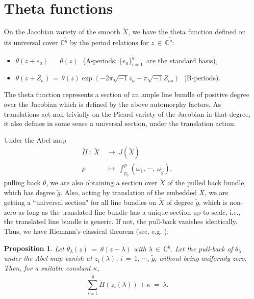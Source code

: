 \documentclass[12pt,reqno]{amsart}
\numberwithin{equation}{section}
\newtheorem{proposition}[theorem]{Proposition}
\theoremstyle{definition}
\theoremstyle{remark}
\def\bC{{\mathbb {C}}}
\begin{document}
\section{Theta functions}

On the Jacobian variety of the smooth $\widetilde X$, we have the theta function defined on its
universal cover $\bC^{\widetilde g}$ by the period relations for $z\,\in\, \bC^{\widetilde g}$:
\begin{itemize} 
\item $\theta(z +e_a) \,=\,\theta(z)$\,\, (A-periods; $\{e_a\}_{i=1}^{\widetilde g}$\, are
the standard basis),

\item $\theta(z+ Z_a)\,=\, \theta(z) \exp(-2\pi\sqrt{-1} z_a -\pi\sqrt{-1} Z_{aa})$\,\, (B-periods).
\end{itemize}

The theta function represents a section of an ample line bundle of positive degree over the
Jacobian which is defined by the above automorphy factors. As translations act non-trivially on the Picard variety of the Jacobian in that degree, it also defines in some sense a universal section, under the translation action.

Under the Abel map 
\begin{align} \nonumber \widetilde \Pi\ :\ \widetilde X\ &\longrightarrow\ J(\widetilde X)\\
p\ &\longmapsto\ \int_{p_0}^p (\omega_1,\,\cdots ,\,\omega_{\widetilde g}),
\end{align}
pulling back $\theta$, we are also obtaining a section over $\widetilde X$ of the pulled back bundle, which
has degree $\widetilde g$. Also, acting by translation of the embedded $\widetilde X$, we are getting
a ``universal section" for all line bundles on $\widetilde X$ of degree $\widetilde g$, which is non-zero
as long as the translated line bundle has a unique section up to scale, i.e., the translated
line bundle is generic. If not, the pull-back vanishes identically. Thus, we have Riemann's classical theorem (see, e.g. \cite[p.~336]{GH}):

\begin{proposition} 
Let $\theta_\lambda(z)\ =\ \theta(z-\lambda)$ with $\lambda \,\in\, \bC^{\widetilde g}$. Let the pull-back
of $\theta_\lambda$ under the Abel map vanish at $z_i(\lambda)$, $i \,=\,1,\,\cdots ,\, \widetilde g$,
without being uniformly zero. Then, for a suitable constant $\kappa$, 
$$\sum_{i=1}^{\widetilde g} \widetilde\Pi(z_i(\lambda) ) +\kappa\ =\ \lambda .$$
\end{proposition}
\end{document}
